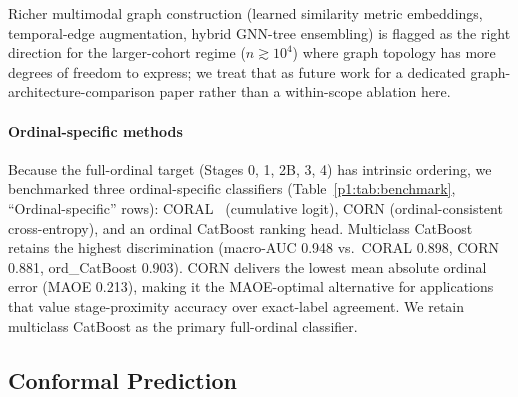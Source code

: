 Richer multimodal graph construction (learned similarity metric embeddings, temporal-edge augmentation, hybrid GNN-tree ensembling) is flagged as the right direction for the larger-cohort regime ($n \gtrsim 10^4$) where graph topology has more degrees of freedom to express; we treat that as future work for a dedicated graph-architecture-comparison paper rather than a within-scope ablation here.

\paragraph*{Ordinal-specific methods} Because the full-ordinal target (Stages 0, 1, 2B, 3, 4) has intrinsic ordering, we benchmarked three ordinal-specific classifiers (Table~\ref{p1:tab:benchmark}, ``Ordinal-specific'' rows): CORAL~\cite{bonnier2022ordinal} (cumulative logit), CORN (ordinal-consistent cross-entropy), and an ordinal CatBoost ranking head. Multiclass CatBoost retains the highest discrimination (macro-AUC 0.948 vs.\ CORAL 0.898, CORN 0.881, ord\_CatBoost 0.903). CORN delivers the lowest mean absolute ordinal error (MAOE 0.213), making it the MAOE-optimal alternative for applications that value stage-proximity accuracy over exact-label agreement. We retain multiclass CatBoost as the primary full-ordinal classifier.

\subsection{Conformal Prediction}

